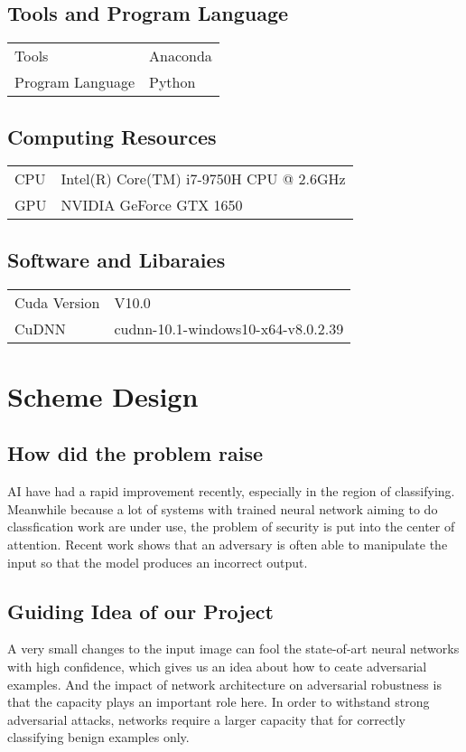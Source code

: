 \documentclass[
	letterpaper, %
	10pt, %
]{CSUniSchoolLabReport}
\begin{document}
\subsection{Tools and Program Language}
\begin{tabular}{l l}
	Tools & {Anaconda}\\ 
	Program Language & {Python}\\
\end{tabular}
\subsection{Computing Resources}
\begin{tabular}{l l}
	CPU & {Intel(R) Core(TM) i7-9750H CPU @ 2.6GHz} \\
	GPU & {NVIDIA GeForce GTX 1650} \\
\end{tabular}

\subsection{Software and Libaraies}
\begin{tabular}{l l}
	Cuda Version & {V10.0} \\
	CuDNN & {cudnn-10.1-windows10-x64-v8.0.2.39} \\
\end{tabular}


\section{Scheme Design}
\subsection{How did the problem raise}
AI have had a rapid improvement recently, especially in the region of classifying. Meanwhile because a lot of systems with trained neural network aiming to do classfication work are under use, the problem of security is put into the center of attention. Recent work shows that an adversary is often able to manipulate the input so that the model produces an incorrect output.
\subsection{Guiding Idea of our Project}
A very small changes to the input image can fool the state-of-art neural networks with high confidence, which gives us an idea about how to ceate adversarial examples. And the impact of network architecture on adversarial robustness is that the capacity plays an important role here. In order to withstand strong adversarial attacks, networks require a larger capacity that for correctly classifying benign examples only.
\end{document}
